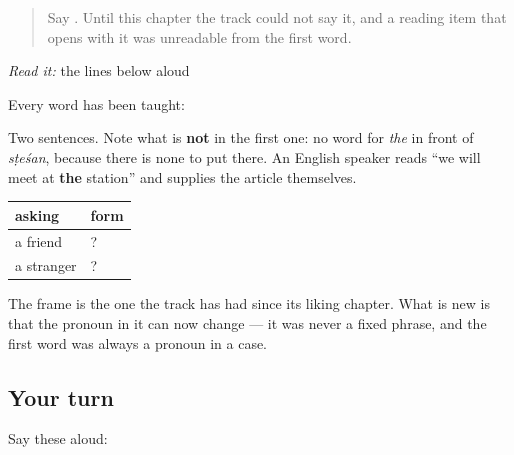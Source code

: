 \label{lesson:HI-C86-sintesis-sarvanam}



\begin{quote}
Say \textbf{}. Until this chapter the track could not say it, and a reading item that opens with it was unreadable from the first word.
\end{quote}

\begin{tcolorbox}[breakable,skin=enhanced,colback=orange!6,colframe=orange!45!black,boxrule=0.5pt,arc=1mm,left=6pt,right=6pt,top=4pt,bottom=4pt,fonttitle=\bfseries,title={Read this}]
\emph{Read it:} the lines below aloud

Every word has been taught:

\begin{quote}
        
\end{quote}

Two sentences. Note what is \textbf{not} in the first one: no word for \emph{the} in front of \emph{sṭeśan}, because there is none to put there. An English speaker reads \textquotedblleft{}we will meet at \textbf{the} station\textquotedblright{} and supplies the article themselves.
\end{tcolorbox}

\begin{grammarlens}[title={Grammar Lens: choosing between the obliques in a real question}]
\noindent
\begin{tabularx}{\linewidth}{@{}>{\raggedright\arraybackslash}X>{\raggedright\arraybackslash}X@{}}
\toprule
\textbf{asking} & \textbf{form} \\
\midrule
a friend & \hi{तुम्हें} \hi{क्या} \hi{पसंद} \hi{है}? \\
a stranger & \hi{आपको} \hi{क्या} \hi{पसंद} \hi{है}? \\
\bottomrule
\end{tabularx}

The frame is the one the track has had since its liking chapter. What is new is that the pronoun in it can now change — it was never a fixed phrase, and the first word was always a pronoun in a case.
\end{grammarlens}

\subsection*{Your turn}
Say these aloud:

